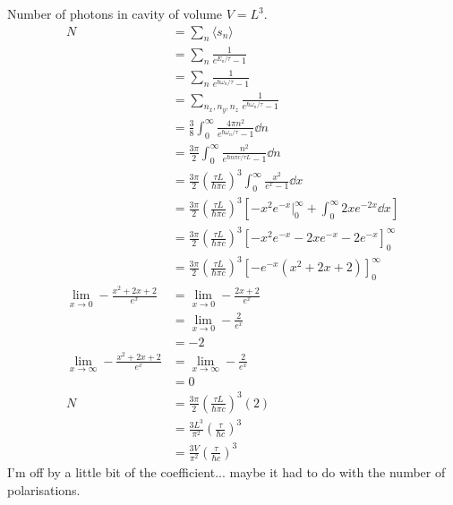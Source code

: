 \documentclass[newpage]{homework}
\begin{document}
\maketitle


\question
Number of photons in cavity of volume $V = L^3$.
\begin{align*}
    N   &=  \sum_n \langle s_n \rangle 	\\
    &=	\sum_n \frac{1}{e^{E_n / \tau}-1}	\\
    &=	\sum_n \frac{1}{e^{\hbar \omega_n / \tau}-1}	\\
    &=  \sum_{n_x,n_y,n_z} \frac{1}{e^{\hbar \omega_n / \tau}-1}    \\
    &=  \frac{3}{8}\int_0^\infty \frac{4\pi n^2}{e^{\hbar \omega_n / \tau}-1} \dd{n}    \\
    &=  \frac{3\pi}{2}\int_0^\infty \frac{n^2}{e^{\hbar n\pi c / \tau L}-1} \dd{n}    \\
    &=  \frac{3\pi}{2} \left(\frac{\tau L}{\hbar\pi c}\right)^3 \int_0^\infty \frac{x^2}{e^x-1} \dd{x}  \\
    &=  \frac{3\pi}{2} \left(\frac{\tau L}{\hbar\pi c}\right)^3 \left[ -x^2 e^{-x}|_0^\infty + \int_0^\infty 2xe^{-2x} \dd{x}  \right]  \\
    &=  \frac{3\pi}{2} \left(\frac{\tau L}{\hbar\pi c}\right)^3 \left[ -x^2 e^{-x} - 2xe^{-x} - 2e^{-x} \right]_0^\infty   \\
    &=  \frac{3\pi}{2} \left(\frac{\tau L}{\hbar\pi c}\right)^3 \left[ - e^{-x} (x^2 + 2x + 2) \right]_0^\infty    \\
    \lim_{x \to 0} -\frac{x^2 + 2x + 2}{e^x}    &=  \lim_{x \to 0} -\frac{2x + 2}{e^x}  \\
        &=  \lim_{x \to 0} -\frac{2}{e^x}   \\
        &=  -2  \\
    \lim_{x \to \infty} -\frac{x^2 + 2x + 2}{e^x}   &=  \lim_{x \to \infty} -\frac{2}{e^x}  \\
        &=  0   \\
    N   &=  \frac{3\pi}{2} \left(\frac{\tau L}{\hbar\pi c}\right)^3 (2)    \\
    &=  \frac{3 L^3}{\pi^2} \left(\frac{\tau}{\hbar c}\right)^3 \\
    &=  \boxed{\frac{3 V}{\pi^2} \left(\frac{\tau}{\hbar c}\right)^3}
\end{align*}
I'm off by a little bit of the coefficient... maybe it had to do with the number of polarisations.
\end{document}
